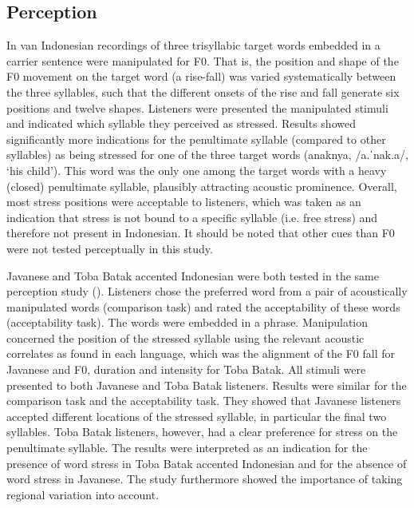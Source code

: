 \subsection{Perception} \label{sec522}
In van \citet{vanzanten_word_2004} Indonesian recordings of three trisyllabic target words embedded in a carrier sentence were manipulated for F0. That is, the position and shape of the F0 movement on the target word (a rise-fall) was varied systematically between the three syllables, such that the different onsets of the rise and fall generate six positions and twelve shapes. Listeners were presented the manipulated stimuli and indicated which syllable they perceived as stressed. Results showed significantly more indications for the penultimate syllable (compared to other syllables) as being stressed for one of the three target words (anaknya, /a.ˈnak.a/, `his child'). This word was the only one among the target words with a heavy (closed) penultimate syllable, plausibly attracting acoustic prominence. Overall, most stress positions were acceptable to listeners, which was taken as an indication that stress is not bound to a specific syllable (i.e. free stress) and therefore not present in Indonesian. It should be noted that other cues than F0 were not tested perceptually in this study.\par

Javanese and Toba Batak accented Indonesian were both tested in the same perception study (\citealt{goedemans_stress_2007}). Listeners chose the preferred word from a pair of acoustically manipulated words (comparison task) and rated the acceptability of these words (acceptability task). The words were embedded in a phrase. Manipulation concerned the position of the stressed syllable using the relevant acoustic correlates as found in each language, which was the alignment of the F0 fall for Javanese and F0, duration and intensity for Toba Batak. All stimuli were presented to both Javanese and Toba Batak listeners. Results were similar for the comparison task and the acceptability task. They showed that Javanese listeners accepted different locations of the stressed syllable, in particular the final two syllables. Toba Batak listeners, however, had a clear preference for stress on the penultimate syllable. The results were interpreted as an indication for the presence of word stress in Toba Batak accented Indonesian and for the absence of word stress in Javanese. The study furthermore showed the importance of taking regional variation into account.\par

